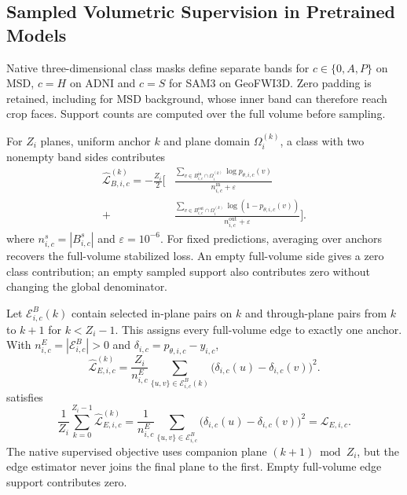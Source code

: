 \documentclass[12pt,a4paper]{article}
\begin{document}
\subsection{Sampled Volumetric Supervision in Pretrained Models}
\label{sec:sampled-pretrained-supervision}

Native three-dimensional class masks define separate bands for
$c\in\{0,A,P\}$ on MSD, $c=H$ on ADNI and $c=S$ for SAM3 on
GeoFWI3D. Zero padding is retained, including for MSD background,
whose inner band can therefore reach crop faces. Support counts are
computed over the full volume before sampling.

For $Z_i$ planes, uniform anchor $k$ and plane domain
$\Omega_i^{(k)}$, a class with two nonempty band sides contributes
\begin{equation}
\begin{aligned}
\widehat{\mathcal{L}}_{B,i,c}^{(k)}
=-\frac{Z_i}{2}\Biggl[
 &\frac{\sum_{v\in B_{i,c}^{\mathrm{in}}\cap\Omega_i^{(k)}}
                  \log p_{\theta,i,c}(v)}
        {n_{i,c}^{\mathrm{in}}+\varepsilon}\\
 {}+{}&\frac{\sum_{v\in B_{i,c}^{\mathrm{out}}\cap\Omega_i^{(k)}}
                  \log(1-p_{\theta,i,c}(v))}
        {n_{i,c}^{\mathrm{out}}+\varepsilon}\Biggr].
\end{aligned}
\label{eq:medsam-sampled-band-loss}
\end{equation}
where $n_{i,c}^s=|B_{i,c}^s|$ and $\varepsilon=10^{-6}$.
For fixed predictions, averaging over anchors recovers the full-volume
stabilized loss. An empty full-volume side gives a zero class contribution;
an empty sampled support also contributes zero without changing the
global denominator.

Let $\mathcal E_{i,c}^B(k)$ contain selected in-plane pairs on $k$
and through-plane pairs from $k$ to $k+1$ for $k<Z_i-1$.
This assigns every full-volume edge to exactly one anchor. With
$n_{i,c}^E=|\mathcal E_{i,c}^B|>0$ and
$\delta_{i,c}=p_{\theta,i,c}-y_{i,c}$,
\begin{equation}
\widehat{\mathcal{L}}_{E,i,c}^{(k)}
=\frac{Z_i}{n_{i,c}^E}
  \sum_{\{u,v\}\in\mathcal{E}_{i,c}^B(k)}
    \bigl(\delta_{i,c}(u)-\delta_{i,c}(v)\bigr)^2.
\label{eq:medsam-sampled-edge-loss}
\end{equation}
satisfies
\begin{equation}
\frac{1}{Z_i}\sum_{k=0}^{Z_i-1}
  \widehat{\mathcal{L}}_{E,i,c}^{(k)}
=\frac{1}{n_{i,c}^E}\sum_{\{u,v\}\in\mathcal{E}_{i,c}^B}
    \bigl(\delta_{i,c}(u)-\delta_{i,c}(v)\bigr)^2
=\mathcal{L}_{E,i,c}.
\label{eq:medsam-edge-expectation}
\end{equation}
The native supervised objective uses companion plane
$(k+1)\bmod Z_i$, but the edge estimator never joins the final
plane to the first. Empty full-volume edge support contributes zero.
\end{document}
